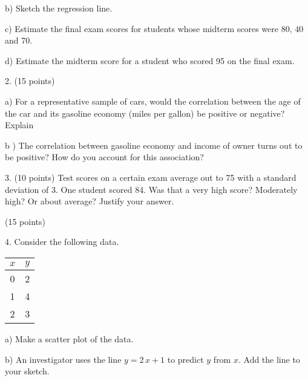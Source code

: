 \documentclass[10pt]{article}
\begin{document}
\hspace{20pt} b) Sketch the regression line. %
\vspace{1.5in}

\hspace{20pt} c) 
Estimate the  final exam scores for students whose midterm scores were
80, 40 and 70. %
\vspace{2.5in}

\hspace{20pt} d) Estimate the midterm score for a student who scored 95 on the final exam.
\vfill
\eject
{\ }


2. (15 points) 

\hspace{20pt} a) For a representative sample of cars, would the correlation between the
age of the car and its gasoline economy (miles per gallon) be positive or negative?  Explain
\vspace{1.75in}

\hspace{20pt} b ) The correlation between gasoline economy and income of owner turns out to 
be positive?  How do you account for this association?
\vspace{2in}




3. (10 points) Test scores on a certain exam average out to 75 with a standard 
deviation of 3.  One student scored 84.   Was that a very high score?  Moderately high?  
Or about average?  Justify your answer.
\vfill
\eject

 (15 points)\vspace{-15pt}

4. Consider the following data.
\begin{tabular}{|c|c|}\hline
$x$ & $y$\\\hline
0   & 2\\
1   & 4\\
2   & 3\\\hline
\end{tabular}

\hspace{10pt} a) Make a scatter plot of the data.  
\vspace{1.5in}

\hspace{10pt} b) An investigator uses the line $y=2\,x + 1$ to predict $y$ from $x$.
Add the line to your sketch.
\medskip
\end{document}
